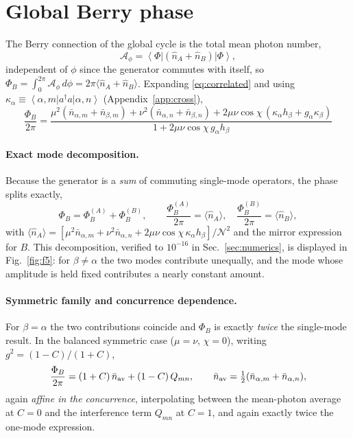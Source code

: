 \documentclass[11pt]{article}
\newcommand{\ket}[1]{\left|#1\right\rangle}
\newcommand{\bra}[1]{\left\langle#1\right|}
\newcommand{\nop}{\hat n}
\begin{document}
\section{Global Berry phase}
\label{sec:berry}

The Berry connection of the global cycle is the total mean photon number,
\begin{equation}
\mathcal A_\phi=\bra{\Phi}(\nop_A+\nop_B)\ket{\Phi} ,
\label{eq:connection}
\end{equation}
independent of $\phi$ since the generator commutes with itself, so
$\Phi_B=\int_0^{2\pi}\mathcal A_\phi\,d\phi=2\pi\langle\nop_A+\nop_B\rangle$.
Expanding \eqref{eq:correlated} and using
$\kappa_\alpha\equiv\bra{\alpha,m}a^\dagger a\ket{\alpha,n}$
(Appendix~\ref{app:cross}),
\begin{equation}
\boxed{\;
\frac{\Phi_B}{2\pi}=
\frac{\mu^2(\bar n_{\alpha,m}+\bar n_{\beta,m})
+\nu^2(\bar n_{\alpha,n}+\bar n_{\beta,n})
+2\mu\nu\cos\chi\,(\kappa_\alpha h_\beta+g_\alpha\kappa_\beta)}
{1+2\mu\nu\cos\chi\,g_\alpha h_\beta}\;}
\label{eq:berry-global}
\end{equation}

\paragraph{Exact mode decomposition.}
Because the generator is a \emph{sum} of commuting single-mode operators, the
phase splits exactly,
\begin{equation}
\Phi_B=\Phi_B^{(A)}+\Phi_B^{(B)},\qquad
\frac{\Phi_B^{(A)}}{2\pi}=\langle\nop_A\rangle,\quad
\frac{\Phi_B^{(B)}}{2\pi}=\langle\nop_B\rangle ,
\label{eq:mode-split}
\end{equation}
with $\langle\nop_A\rangle=[\mu^2\bar n_{\alpha,m}+\nu^2\bar n_{\alpha,n}
+2\mu\nu\cos\chi\,\kappa_\alpha h_\beta]/\mathcal N^2$ and the mirror
expression for $B$. This decomposition, verified to $10^{-16}$ in
Sec.~\ref{sec:numerics}, is displayed in Fig.~\ref{fig:f5}: for $\beta\neq\alpha$
the two modes contribute unequally, and the mode whose amplitude is held fixed
contributes a nearly constant amount.

\paragraph{Symmetric family and concurrence dependence.}
For $\beta=\alpha$ the two contributions coincide and $\Phi_B$ is exactly
\emph{twice} the single-mode result. In the balanced symmetric case
($\mu=\nu$, $\chi=0$), writing $g^2=(1-C)/(1+C)$,
\begin{equation}
\frac{\Phi_B}{2\pi}=(1+C)\,\bar n_{\rm av}+(1-C)\,Q_{mn},
\qquad \bar n_{\rm av}=\tfrac12(\bar n_{\alpha,m}+\bar n_{\alpha,n}),
\label{eq:berry-vs-C}
\end{equation}
again \emph{affine in the concurrence}, interpolating between the mean-photon
average at $C=0$ and the interference term $Q_{mn}$ at $C=1$, and again exactly
twice the one-mode expression.
\end{document}
